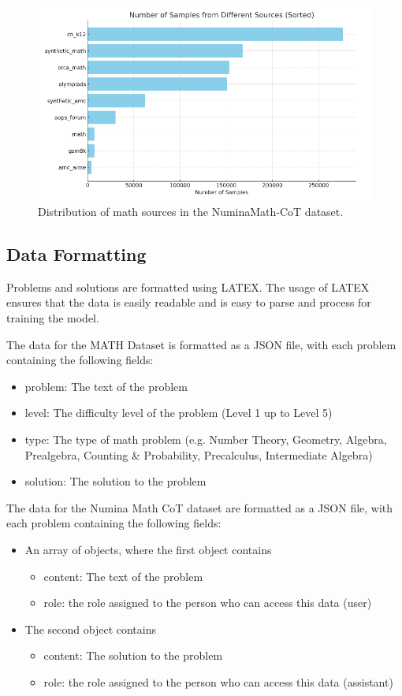 \documentclass{article}
\begin{document}
\begin{figure}[H]
  \centering
  \includegraphics[scale=0.6]{./figures/math_sources.png}
  \caption{Distribution of math sources in the NuminaMath-CoT dataset.}
  \label{fig:math-sources}
\end{figure}


\subsection{Data Formatting}

Problems and solutions are formatted using LATEX. The usage of LATEX ensures that the data is easily readable and is easy to parse and process for training the model.

The data for the MATH Dataset is formatted as a JSON file, with each problem containing the following fields:
\begin{itemize}
  \item problem: The text of the problem
  \item level: The difficulty level of the problem (Level 1 up to Level 5)
  \item type: The type of math problem (e.g. Number Theory, Geometry, Algebra, Prealgebra, Counting \& Probability, Precalculus, Intermediate Algebra)
  \item solution: The solution to the problem
\end{itemize}

The data for the Numina Math CoT dataset are formatted as a JSON file, with each problem containing the following fields:
\begin{itemize}
  \item An array of objects, where the first object contains
      \begin{itemize}
        \item content: The text of the problem
        \item role: the role assigned to the person who can access this data (user)
      \end{itemize}
  \item The second object contains
      \begin{itemize}
        \item content: The solution to the problem
        \item role: the role assigned to the person who can access this data (assistant)
      \end{itemize}
\end{itemize}
\end{document}
